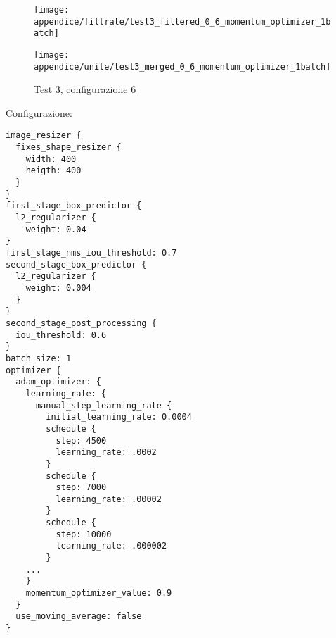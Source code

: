 \newpage
\begin{figure}[H]  
    \begin{minipage}{.5\columnwidth}  
        \centering  
        \texttt{[image: appendice/filtrate/test3\_filtered\_0\_6\_momentum\_optimizer\_1batch]}  
    \end{minipage}%
    \begin{minipage}{0.5\columnwidth}  
        \centering  
        \texttt{[image: appendice/unite/test3\_merged\_0\_6\_momentum\_optimizer\_1batch]}  
    \end{minipage}  
    \caption{Test 3, configurazione 6}
\end{figure}%
Configurazione:
\begin{multicols}{2}
    \begin{lstlisting}
image_resizer {
  fixes_shape_resizer {
    width: 400
    heigth: 400
  }
}
first_stage_box_predictor {
  l2_regularizer {
    weight: 0.04
}
first_stage_nms_iou_threshold: 0.7
second_stage_box_predictor {
  l2_regularizer {
    weight: 0.004
  }
}
second_stage_post_processing {
  iou_threshold: 0.6
}
batch_size: 1
optimizer {
  adam_optimizer: {
    learning_rate: {
      manual_step_learning_rate {
        initial_learning_rate: 0.0004
        schedule {
          step: 4500
          learning_rate: .0002
        }
        schedule {
          step: 7000
          learning_rate: .00002
        }
        schedule {
          step: 10000
          learning_rate: .000002
        }
    ...
    }
    momentum_optimizer_value: 0.9
  }
  use_moving_average: false
}
    \end{lstlisting}
\end{multicols}
